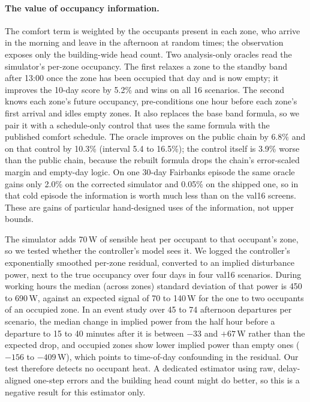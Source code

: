 \documentclass{article}
\begin{document}
\begin{table}[t]
  \caption{Ablations on 10-day val16 episodes, scores in $10^{-3}$; negative $\Delta$ is better. Each block is paired against its reference run (reference score in parentheses). ``Better / 16'' counts scenarios that improve; ``tied'' means within $10^{-9}$. Oracle rows read the simulator's internal occupancy model and are not admissible controllers.}
  \label{tab:ablate}
  \centering
  \small
  \resizebox{\linewidth}{!}{}
\end{table}

\paragraph{The value of occupancy information.} The comfort term is weighted by the occupants present in each zone, who arrive in the morning and leave in the afternoon at random times; the observation exposes only the building-wide head count. Two analysis-only oracles read the simulator's per-zone occupancy. The first relaxes a zone to the standby band after 13:00 once the zone has been occupied that day and is now empty; it improves the 10-day score by 5.2\% and wins on all 16 scenarios. The second knows each zone's future occupancy, pre-conditions one hour before each zone's first arrival and idles empty zones. It also replaces the base band formula, so we pair it with a schedule-only control that uses the same formula with the published comfort schedule. The oracle improves on the public chain by 6.8\% and on that control by 10.3\% (interval 5.4 to 16.5\%); the control itself is 3.9\% worse than the public chain, because the rebuilt formula drops the chain's error-scaled margin and empty-day logic. On one 30-day Fairbanks episode the same oracle gains only 2.0\% on the corrected simulator and 0.05\% on the shipped one, so in that cold episode the information is worth much less than on the val16 screens. These are gains of particular hand-designed uses of the information, not upper bounds.

The simulator adds 70\,W of sensible heat per occupant to that occupant's zone, so we tested whether the controller's model sees it. We logged the controller's exponentially smoothed per-zone residual, converted to an implied disturbance power, next to the true occupancy over four days in four val16 scenarios. During working hours the median (across zones) standard deviation of that power is 450 to 690\,W, against an expected signal of 70 to 140\,W for the one to two occupants of an occupied zone. In an event study over 45 to 74 afternoon departures per scenario, the median change in implied power from the half hour before a departure to 15 to 40 minutes after it is between $-33$ and $+67$\,W rather than the expected drop, and occupied zones show lower implied power than empty ones ($-156$ to $-409$\,W), which points to time-of-day confounding in the residual. Our test therefore detects no occupant heat. A dedicated estimator using raw, delay-aligned one-step errors and the building head count might do better, so this is a negative result for this estimator only.
\end{document}
